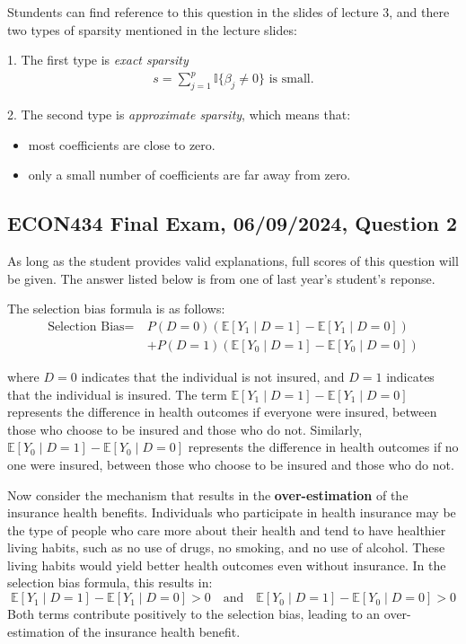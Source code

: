 \documentclass{article}
\begin{document}
Stundents can find reference to this question in the slides of lecture 3, and there two types of sparsity mentioned in the lecture slides: 

1. The first type is \textit{exact sparsity}
\begin{align*}
    s = \sum^p_{j=1} \mathbb{I}\{\beta_j \neq 0\} \text{ is small.} 
\end{align*}

2. The second type is \textit{approximate sparsity}, which means that:
\begin{itemize}
    \item{most coefficients are close to zero.}
    \item{only a small number of coefficients are far away from zero.}
\end{itemize}

\subsection*{ECON434 Final Exam, 06/09/2024, Question 2}
As long as the student provides valid explanations, full scores of this question will be given. The answer listed below is from one of last year's student's reponse.

The selection bias formula is as follows:
\begin{align*}
\text{Selection Bias} =\ & P(D = 0)\left( \mathbb{E}[Y_1 \mid D = 1] - \mathbb{E}[Y_1 \mid D = 0] \right) \\
& + P(D = 1)\left( \mathbb{E}[Y_0 \mid D = 1] - \mathbb{E}[Y_0 \mid D = 0] \right)
\end{align*}

where \( D = 0 \) indicates that the individual is not insured, and \( D = 1 \) indicates that the individual is insured. The term \( \mathbb{E}[Y_1 \mid D = 1] - \mathbb{E}[Y_1 \mid D = 0] \) represents the difference in health outcomes if everyone were insured, between those who choose to be insured and those who do not. Similarly, \( \mathbb{E}[Y_0 \mid D = 1] - \mathbb{E}[Y_0 \mid D = 0] \) represents the difference in health outcomes if no one were insured, between those who choose to be insured and those who do not.

Now consider the mechanism that results in the \textbf{over-estimation} of the insurance health benefits. Individuals who participate in health insurance may be the type of people who care more about their health and tend to have healthier living habits, such as no use of drugs, no smoking, and no use of alcohol. These living habits would yield better health outcomes even without insurance. In the selection bias formula, this results in:
\[
\mathbb{E}[Y_1 \mid D = 1] - \mathbb{E}[Y_1 \mid D = 0] > 0 \quad \text{and} \quad \mathbb{E}[Y_0 \mid D = 1] - \mathbb{E}[Y_0 \mid D = 0] > 0
\]
Both terms contribute positively to the selection bias, leading to an over-estimation of the insurance health benefit.
\end{document}
